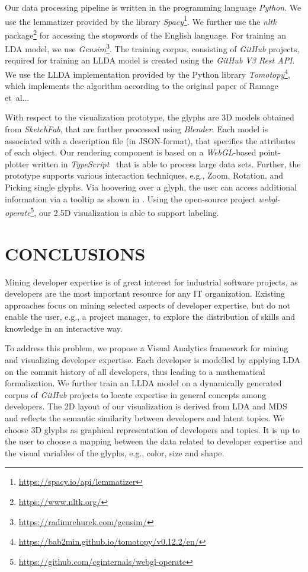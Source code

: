 \documentclass[a4paper,twoside]{article}
\makeatletter
\DeclareRobustCommand\onedot{\futurelet\@let@token\@onedot}
\def\@onedot{\ifx\@let@token.\else.\null\fi\xspace}
\def\etal{et~al\onedot\xspace}
\def\eg{e.g.,\xspace}
\makeatother
\begin{document}
Our data processing pipeline is written in the programming language \textit{Python}.
We use the lemmatizer provided by the library \textit{Spacy}\footnote{\url{https://spacy.io/api/lemmatizer}}.
We further use the \textit{nltk} package\footnote{\url{https://www.nltk.org/}} for accessing the stopwords of the English language. 
For training an \ac{LDA} model, we use \textit{Gensim}\footnote{\url{https://radimrehurek.com/gensim/}}.
The training corpus, consisting of \textit{GitHub} projects, required for training an \ac{LLDA} model is created using the \textit{GitHub V3 Rest API}.
We use the \ac{LLDA} implementation provided by the Python library \textit{Tomotopy}\footnote{\url{https://bab2min.github.io/tomotopy/v0.12.2/en/}}, which implements the algorithm according to the original paper of Ramage \etal \cite{ramage2009labeled}.

With respect to the visualization prototype, the glyphs are 3D models obtained from \textit{SketchFab}, that are further processed using \textit{Blender}.
Each model is associated with a description file (in JSON-format), that specifies the attributes of each object.
Our rendering component is based on a \textit{WebGL}-based point-plotter written in \textit{TypeScript}~\cite{wagner2020-scatterplot} that is able to process large data sets.
Further, the prototype supports various interaction techniques, \eg Zoom, Rotation, and Picking single glyphs.
Via hoovering over a glyph, the user can access additional information via a tooltip as shown in .
Using the open-source project \textit{webgl-operate}\footnote{\url{https://github.com/cginternals/webgl-operate}}, our 2.5D visualization is able to support labeling.

\section{\uppercase{Conclusions}}
\label{KM:Sec:Conclusions}

\noindent Mining developer expertise is of great interest for industrial software projects, as developers are the most important resource for any IT organization.
Existing approaches focus on mining selected aspects of developer expertise, but do not enable the user, \eg a project manager, to explore the distribution of skills and knowledge in an interactive way.

To address this problem, we propose a Visual Analytics framework for mining and visualizing developer expertise.
Each developer is modelled by applying \ac{LDA} on the commit history of all developers, thus leading to a mathematical formalization.
We further train an \ac{LLDA} model on a dynamically generated corpus of \textit{GitHub} projects to locate expertise in general concepts among developers.
The 2D layout of our visualization is derived from \ac{LDA} and \ac{MDS} and reflects the semantic similarity between developers and latent topics.
We choose 3D glyphs as graphical representation of developers and topics.
It is up to the user to choose a mapping between the data related to developer expertise and the visual variables of the glyphs, \eg color, size and shape.
\end{document}
